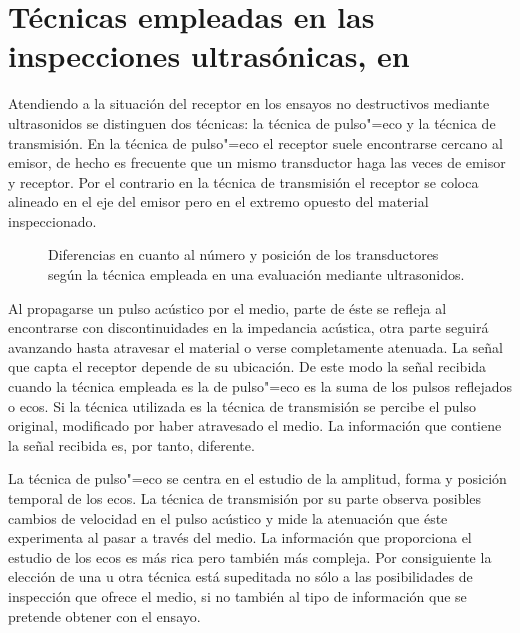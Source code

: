 \section[Técnicas empleadas en las inspecciones ultrasónicas]{Técnicas
empleadas en las inspecciones ultrasónicas, en
}\label{sec:technics}

Atendiendo a la situación del receptor en los ensayos no destructivos
mediante ultrasonidos se distinguen dos técnicas: la técnica de pulso"=eco
y la técnica de transmisión. En la técnica de pulso"=eco el receptor suele
encontrarse cercano al emisor, de hecho es frecuente que un mismo
transductor haga las veces de emisor y receptor. Por el contrario en la
técnica de transmisión el receptor se coloca alineado en el eje del emisor
pero en el extremo opuesto del material inspeccionado.

\begin{figure}
	\begin{center}
			\vspace*{.1\textheight}
	\end{center}
	\caption[Técnicas empleadas en ]{Diferencias en cuanto
	al número y posición de los transductores según la técnica empleada
	en una evaluación mediante ultrasonidos.}
	\label{fig:technics}
\end{figure}

Al propagarse un pulso acústico por el medio, parte de éste se refleja al
encontrarse con discontinuidades en la impedancia acústica, otra parte
seguirá avanzando hasta atravesar el material o verse completamente
atenuada. La señal que capta el receptor depende de su ubicación. De este
modo la señal recibida cuando la técnica empleada es la de pulso"=eco es la
suma de los pulsos reflejados o ecos. Si la técnica utilizada es la técnica
de transmisión se percibe el pulso original, modificado por haber
atravesado el medio. La información que contiene la señal recibida es, por
tanto, diferente.

La técnica de pulso"=eco se centra en el estudio de la amplitud, forma y
posición temporal de los ecos. La técnica de transmisión por su parte
observa posibles cambios de velocidad en el pulso acústico y mide la
atenuación que éste experimenta al pasar a través del medio. La información
que proporciona el estudio de los ecos es más rica pero también más
compleja. Por consiguiente la elección de una u otra técnica está
supeditada no sólo a las posibilidades de inspección que ofrece el medio,
si no también al tipo de información que se pretende obtener con el ensayo.


